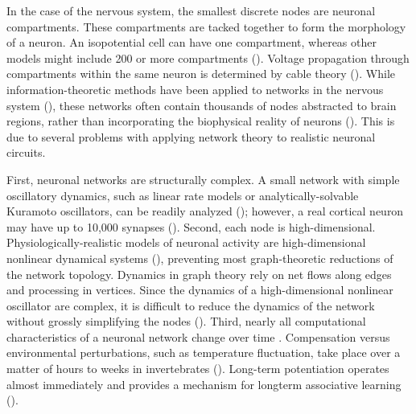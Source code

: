 \documentclass[14pt]{article}
\begin{document}
	In the case of the nervous system, the smallest discrete nodes are neuronal compartments. These compartments are tacked together to form the morphology of a neuron. An isopotential cell can have one compartment, whereas other models might include 200 or more compartments (\cite{TobinCreationreductionmorphologically2006}). Voltage propagation through compartments within the same neuron is determined by cable theory (\cite{NormanCableTheoryFinite1972}). While information-theoretic methods have been applied to networks in the nervous system (\cite{StemmlerHowvoltagedependentconductances1999}), these networks often contain thousands of nodes abstracted to brain regions, rather than incorporating the biophysical reality of neurons (\cite{PapoComplexnetworktheory2014,ReimannCliquesNeuronsBound2017,BullmoreComplexbrainnetworks2009,BassettNetworkneuroscience2017}). This is due to several problems with applying network theory to realistic neuronal circuits.
	
	First, neuronal networks are structurally complex. A small network with simple oscillatory dynamics, such as linear rate models or analytically-solvable Kuramoto oscillators, can be readily analyzed (\cite{MedvedevSmallworldnetworksKuramoto2014}); however, a real cortical neuron may have up to 10,000 synapses (\cite{DayanTheoreticalNeuroscience2001,AzevedoEqualnumbersneuronal2009}). Second, each node is high-dimensional. Physiologically-realistic models of neuronal activity are high-dimensional nonlinear dynamical systems (\cite{Harris-WarrickDynamicBiologicalNetworks1992,DayanTheoreticalNeuroscience2001}), preventing most graph-theoretic reductions of the network topology. Dynamics in graph theory rely on net flows along edges and processing in vertices. Since the dynamics of a high-dimensional nonlinear oscillator are complex, it is difficult to reduce the dynamics of the network without grossly simplifying the nodes (\cite{ReyesModelingApproachWhy2015,ElicesAsymmetryFactorsShaping2017,DAngeloRealisticmodelingneurons2013}). Third, nearly all computational characteristics of a neuronal network change over time \cite{Harris-WarrickDynamicBiologicalNetworks1992}. Compensation versus environmental perturbations, such as temperature fluctuation, take place over a matter of hours to weeks in invertebrates (\cite{TangPreciseTemperatureCompensation2010,TangRobustnessrhythmiccircuit2012,RoemschiedCellintrinsicmechanismstemperature2014}). Long-term potentiation operates almost immediately and provides a mechanism for longterm associative learning (\cite{NarayananLongTermPotentiationRat2007,Takeuchisynapticplasticitymemory2014}).
	
\end{document}
